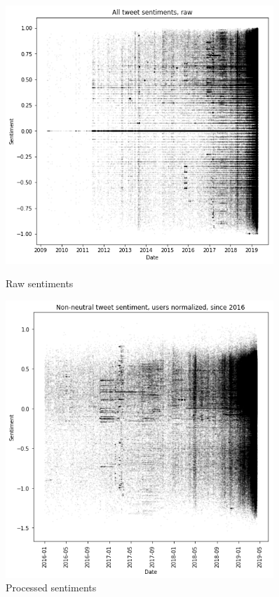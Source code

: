 \documentclass[11pt]{article}
\begin{document}
\begin{figure}[h!]
    \centering
    \begin{minipage}{0.45\textwidth}
        \centering
        \includegraphics[width=0.9\textwidth]{raw_sentiments} %
        \caption{Raw sentiments}
    \end{minipage}\hfill
    \begin{minipage}{0.45\textwidth}
        \centering
        \includegraphics[width=0.9\textwidth]{nnz_since_2016} %
        \caption{Processed sentiments}
    \end{minipage}
\end{figure}
\end{document}
